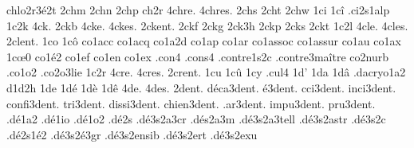 {                    chlo2r3\'e2t
2chm
2chn
2chp
ch2r
4chre.
4chres.
2chs
2cht
2chw
1ci
1c\^i
                    .ci2s1alp
1c2k
4ck.
2ckb
4cke.
4ckes.
2ckent. %
2ckf
2ckg
2ck3h
2ckp
2cks
2ckt
1c2l
4cle.
4cles.
2clent. %
1co
1c\^o
                    co1acc
                    co1acq
                    co1a2d
                    co1ap
                    co1ar
                    co1assoc
                    co1assur
                    co1au
                    co1ax
1c\oe0 %
                    co1\'e2
                    co1ef
                    co1en
                    co1ex
                    .con4  %
                    .cons4 %
                    .contre1s2c
                    .contre3ma\^itre %
                    co2nurb
                    .co1o2
                    .co2o3lie
1c2r
4cre.
4cres.
2crent. %
1cu
1c\^u
1cy
.cul4 %
1d'
1da
1d\^a
                    .dacryo1a2
d1d2h
1de
1d\'e
1d\`e
1d\^e
4de.
4des.
      2dent.
d\'eca3dent.
   \'e3dent.
   cci3dent.
  inci3dent.
 confi3dent.
   tri3dent.
 dissi3dent.
 chien3dent.
   .ar3dent.
  impu3dent.
   pru3dent.
%
                    .d\'e1a2
                    .d\'e1io
                    .d\'e1o2
                    .d\'e2s %
                    .d\'e3s2a3cr
                    .d\'es2a3m %
                    .d\'e3s2a3tell
                    .d\'e3s2astr
                    .d\'e3s2c %
                    .d\'e2s1\'e2
                    .d\'e3s2\'e3gr
                    .d\'e3s2ensib
                    .d\'e3s2ert
                    .d\'e3s2exu
}
